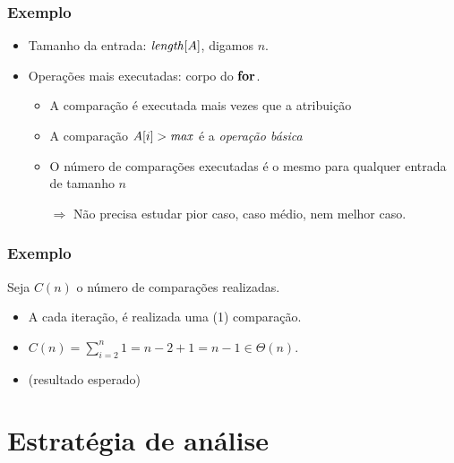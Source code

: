 \documentclass[handout]{beamer}
\begin{document}
\begin{frame}
  \frametitle{Exemplo}

  \begin{small}
    
  \end{small}

\begin{itemize}
\item Tamanho da entrada: $\id{length}[A]$, digamos $n$.
\item Operações mais executadas: corpo do $\textbf{for}$.
  \begin{itemize}
    \item A comparação é executada mais vezes que a atribuição
    \item A comparação $A[i] > \id{max}$ é a \emph{operação básica}
    \item O número de comparações
      executadas é o mesmo para
      qualquer entrada de tamanho
      $n$
      
      \alert{$\Longrightarrow$}
      Não precisa estudar pior caso, caso médio, nem melhor caso.
  \end{itemize}
  \end{itemize}
\end{frame}


\begin{frame}
  \frametitle{Exemplo}

  \begin{small}
    
  \end{small}

Seja $C(n)$ o número de comparações realizadas.
\begin{itemize}
\item A cada iteração, é realizada uma (1) comparação.
\item $C(n) = \sum_{i=2}^{n} 1 = n - 2 + 1 = n - 1 \in \Theta(n) $.
\item (resultado esperado)
\end{itemize}
\end{frame}

\section{Estratégia de análise}
\end{document}
